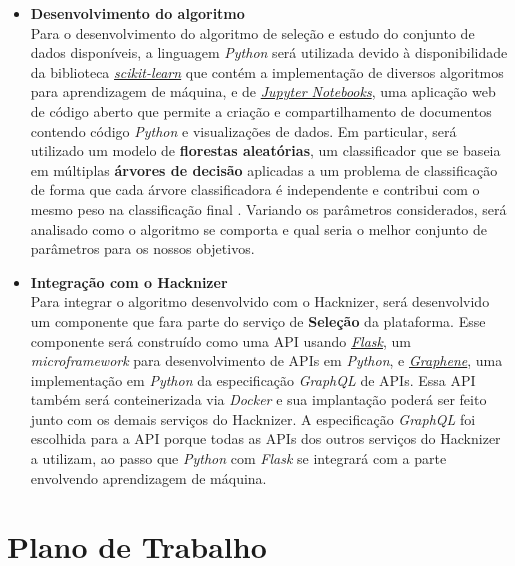 \documentclass[10pt,twoside,a4paper]{article}
\begin{document}
      \begin{itemize}
          \item \textbf{Desenvolvimento do algoritmo} \\
          Para o desenvolvimento do algoritmo de seleção e estudo do conjunto de dados disponíveis, a linguagem \textit{Python} será utilizada devido à disponibilidade da biblioteca \href{http://scikit-learn.org}{\textit{scikit-learn}} que contém a implementação de diversos algoritmos para aprendizagem de máquina, e de \href{http://jupyter.org/}{\textit{Jupyter Notebooks}}, uma aplicação web de código aberto que permite a criação e compartilhamento de documentos contendo código \textit{Python} e visualizações de dados. Em particular, será utilizado um modelo de \textbf{florestas aleatórias}, um classificador que se baseia em múltiplas \textbf{árvores de decisão} aplicadas a um problema de classificação de forma que cada árvore classificadora é independente e contribui com o mesmo peso na classificação final \cite{Breiman2001RandomForests}. Variando os parâmetros considerados, será analisado como o algoritmo se comporta e qual seria o melhor conjunto de parâmetros para os nossos objetivos.
          
          \item \textbf{Integração com o Hacknizer} \\
          Para integrar o algoritmo desenvolvido com o Hacknizer, será desenvolvido um componente que fara parte do serviço de \textbf{Seleção} da plataforma. Esse componente será construído como uma API usando \href{http://flask.pocoo.org/}{\textit{Flask}}, um \textit{microframework} para desenvolvimento de APIs em \textit{Python}, e \href{https://graphene-python.org/}{\textit{Graphene}}, uma implementação em \textit{Python} da especificação \textit{GraphQL} de APIs. Essa API também será conteinerizada via \textit{Docker} e sua implantação poderá ser feito junto com os demais serviços do Hacknizer.
          A especificação \textit{GraphQL} foi escolhida para a API porque todas as APIs dos outros serviços do Hacknizer a utilizam, ao passo que \textit{Python} com \textit{Flask} se integrará com a parte envolvendo aprendizagem de máquina.
      \end{itemize}
    
\section{Plano de Trabalho}
  
\end{document}
